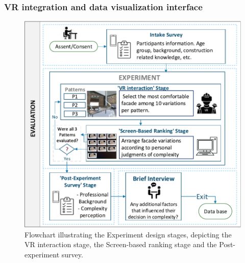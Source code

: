 \documentclass[final,5p,times]{elsarticle}%
\begin{document}
\begin{linenumbers}
        \subsubsection{VR integration and data visualization interface}
        \label{subsubsec:VR_integration}
        

            \begin{figure}[htb]
                  \centering
                  \includegraphics[width= \linewidth, trim=0 0 0 0, clip]{Images/FlowchartExperiment}
                  \caption{Flowchart illustrating the Experiment design stages, depicting the VR interaction stage, the Screen-based ranking stage and the Post-experiment survey.}
                  \label{fig:ExperimentFlowchart}
                \end{figure}


\end{linenumbers}
\end{document}
